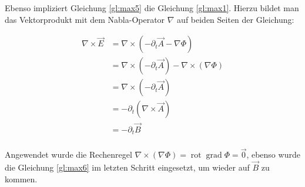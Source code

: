 Ebenso impliziert Gleichung \ref{gl:max5} die Gleichung \ref{gl:max1}. Hierzu bildet man das Vektorprodukt mit dem Nabla-Operator $\nabla$ auf beiden Seiten der Gleichung:

\begin{align*}
\nabla \times \vec{E} &= \nabla \times (-\partial_t\vec{A} - \nabla\Phi) \\
 &= \nabla \times (-\partial_t\vec{A}) - \nabla \times(\nabla\Phi) \\
 &= \nabla \times (-\partial_t\vec{A}) \\
 &= -\partial_t (\nabla \times \vec{A}) \\
 &= -\partial_t \vec{B} \\
\end{align*}

Angewendet wurde die Rechenregel $\nabla \times(\nabla\Phi) = \operatorname{rot}\operatorname{grad}\Phi = \vec{0} $, ebenso wurde die Gleichung \ref{gl:max6} im letzten Schritt eingesetzt, um wieder auf $\vec{B}$ zu kommen.


